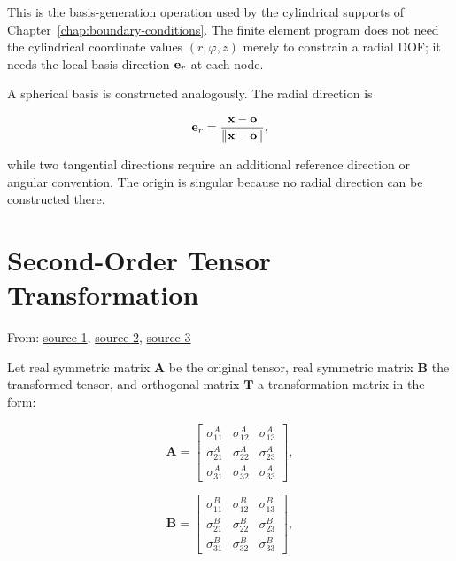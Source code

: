 This is the basis-generation operation used by the cylindrical supports of
Chapter~\ref{chap:boundary-conditions}. The finite element program does not need
the cylindrical coordinate values $(r,\varphi,z)$ merely to constrain a radial
DOF; it needs the local basis direction $\mathbf{e}_r$ at each node.

A spherical basis is constructed analogously. The radial direction is

\begin{equation}
    \mathbf{e}_r=\frac{\mathbf{x}-\mathbf{o}}{\| {\mathbf{x}-\mathbf{o}} \|},
\end{equation}

while two tangential directions require an additional reference direction or
angular convention. The origin is singular because no radial direction can be
constructed there.

\section{Second-Order Tensor Transformation}

From:
\href{https://wp.optics.arizona.edu/optomech/wp-content/uploads/sites/53/2016/10/OPTI_222_W21.pdf}{source 1},
\href{https://www.continuummechanics.org/principalstressesandstrains.html}{source 2},
\href{https://www.ecourses.ou.edu/cgi-bin/eBook.cgi?doc=&topic=me&chap_sec=07.2&page=theory}{source 3}

Let real symmetric matrix  $\mathbf{A}$ be the original tensor,
real symmetric matrix $\mathbf{B}$ the transformed tensor, and
orthogonal matrix $\mathbf{T}$ a transformation matrix in the form:

\begin{equation}
    \mathbf{A} = \begin{bmatrix}
        \sigma^{A}_{11} & \sigma^{A}_{12} & \sigma^{A}_{13} \\
        \sigma^{A}_{21} & \sigma^{A}_{22} & \sigma^{A}_{23} \\
        \sigma^{A}_{31} & \sigma^{A}_{32} & \sigma^{A}_{33}
    \end{bmatrix}
,\end{equation}

\begin{equation}
    \mathbf{B} = \begin{bmatrix}
        \sigma^{B}_{11} & \sigma^{B}_{12} & \sigma^{B}_{13} \\
        \sigma^{B}_{21} & \sigma^{B}_{22} & \sigma^{B}_{23} \\
        \sigma^{B}_{31} & \sigma^{B}_{32} & \sigma^{B}_{33}
    \end{bmatrix}
,\end{equation}

